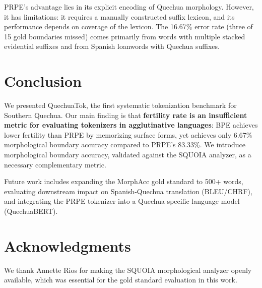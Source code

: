 \documentclass[11pt]{article}
\begin{document}
PRPE's advantage lies in its explicit encoding of Quechua morphology. However, it has limitations: it requires a manually constructed suffix lexicon, and its performance depends on coverage of the lexicon. The 16.67\% error rate (three of 15 gold boundaries missed) comes primarily from words with multiple stacked evidential suffixes and from Spanish loanwords with Quechua suffixes.

\section{Conclusion}

We presented QuechuaTok, the first systematic tokenization benchmark for Southern Quechua. Our main finding is that \textbf{fertility rate is an insufficient metric for evaluating tokenizers in agglutinative languages}: BPE achieves lower fertility than PRPE by memorizing surface forms, yet achieves only 6.67\% morphological boundary accuracy compared to PRPE's 83.33\%. We introduce morphological boundary accuracy, validated against the SQUOIA analyzer, as a necessary complementary metric.

Future work includes expanding the MorphAcc gold standard to 500+ words, evaluating downstream impact on Spanish-Quechua translation (BLEU/CHRF), and integrating the PRPE tokenizer into a Quechua-specific language model (QuechuaBERT).

\section*{Acknowledgments}

We thank Annette Rios for making the SQUOIA morphological analyzer openly available, which was essential for the gold standard evaluation in this work.



\end{document}
